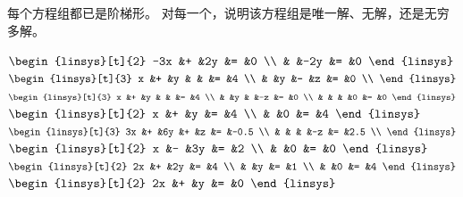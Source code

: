 \begin{exercises}
  \item
    每个方程组都已是阶梯形。
    对每一个，说明该方程组是唯一解、无解，还是无穷多解。
    \begin{exparts*}
      \partsitem 
        \(\begin{linsys}[t]{2}
           -3x &+ &2y   &= &0  \\          
               &  &-2y  &= &0            
        \end{linsys}\)
      \partsitem 
        \(\begin{linsys}[t]{3}
             x &+ &y &  &   &= &4  \\          
               &  &y &- &z  &= &0  \\           
        \end{linsys}\)
      \partsitem 
        \(\begin{linsys}[t]{3}
             x &+ &y &  &   &= &4  \\          
               &  &y &  &-z  &= &0  \\ 
               &  &  &  &0  &= &0  
        \end{linsys}\)
      \partsitem 
        \(\begin{linsys}[t]{2}
             x &+ &y    &= &4  \\          
               &  &0    &= &4            
        \end{linsys}\)
      \partsitem 
        \(\begin{linsys}[t]{3}
            3x &+ &6y &+  &z  &= &-0.5  \\          
               &  &   &   &-z &= &2.5  \\           
        \end{linsys}\)
      \partsitem 
        \(\begin{linsys}[t]{2}
             x &- &3y    &= &2  \\          
               &  &0    &= &0            
        \end{linsys}\)
      \partsitem 
        \(\begin{linsys}[t]{2}
             2x &+ &2y    &= &4  \\
                &  &y     &= &1 \\          
                 &  &0    &= &4            
        \end{linsys}\)
      \partsitem 
        \(\begin{linsys}[t]{2}
              2x &+ &y   &= &0  
        \end{linsys}\)
      \partsitem 

\end{exparts*}
\end{exercises}
